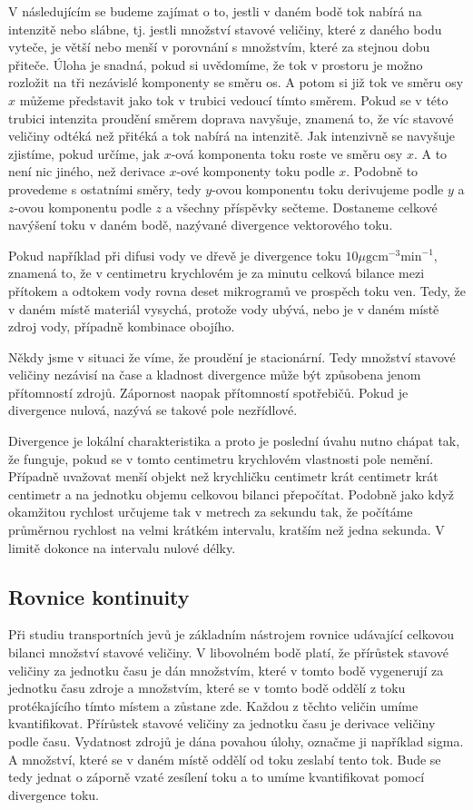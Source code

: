 \documentclass[12pt]{article}
\begin{document}
V následujícím se budeme zajímat o to, jestli v daném bodě tok nabírá na intenzitě nebo slábne, tj. jestli množství stavové veličiny, které z daného bodu vyteče, je větší nebo menší v porovnání s množstvím, které za stejnou dobu přiteče. Úloha je snadná, pokud si uvědomíme, že tok v prostoru je možno rozložit na tři nezávislé komponenty se směru os. A potom si již tok ve směru osy $x$ můžeme představit jako tok v trubici vedoucí tímto směrem. Pokud se v této trubici intenzita proudění směrem doprava navyšuje, znamená to, že víc stavové veličiny odtéká než přitéká a tok nabírá na intenzitě. Jak intenzivně se navyšuje zjistíme, pokud určíme, jak $x$-ová komponenta toku roste ve směru osy $x$. A to není nic jiného, než derivace $x$-ové komponenty toku podle $x$. Podobně to provedeme s ostatními směry, tedy $y$-ovou komponentu toku derivujeme podle $y$ a $z$-ovou komponentu podle $z$ a všechny příspěvky sečteme. Dostaneme celkové navýšení toku v daném bodě, nazývané divergence vektorového toku. 

Pokud například při difusi vody ve dřevě je divergence toku $10\mu \mathrm g \mathrm {cm}^{-3} \mathrm {min}^{-1}$, znamená to, že v centimetru krychlovém je za minutu celková bilance mezi přítokem a odtokem vody rovna deset mikrogramů ve prospěch toku ven. Tedy, že v daném místě materiál vysychá, protože vody ubývá, nebo je v daném místě zdroj vody, případně kombinace obojího. 

Někdy jsme v situaci že víme, že proudění je stacionární. Tedy množství stavové veličiny nezávisí na čase a kladnost divergence může být způsobena jenom přítomností zdrojů. Zápornost naopak přítomností spotřebičů. Pokud je divergence nulová, nazývá se takové pole nezřídlové.

Divergence je lokální charakteristika a proto je poslední úvahu nutno chápat tak, že funguje, pokud se v tomto centimetru krychlovém vlastnosti pole nemění. Případně uvažovat menší objekt než krychličku centimetr krát centimetr krát centimetr a na jednotku objemu celkovou bilanci přepočítat. Podobně jako když okamžitou rychlost určujeme tak v metrech za sekundu tak, že počítáme průměrnou rychlost na velmi krátkém intervalu, kratším než jedna sekunda. V limitě dokonce na intervalu nulové délky.


\subsection{Rovnice kontinuity}

Při studiu transportních jevů je základním nástrojem rovnice udávající celkovou bilanci množství stavové veličiny. V libovolném bodě platí, že přírůstek stavové veličiny za jednotku času je dán množstvím, které v tomto bodě vygenerují za jednotku času zdroje a množstvím, které se v tomto bodě oddělí z toku protékajícího tímto místem a zůstane zde. Každou z těchto veličin umíme kvantifikovat. Přírůstek stavové veličiny za jednotku času je derivace veličiny podle času. Vydatnost zdrojů je dána povahou úlohy, označme ji například sigma. A množství, které se v daném místě oddělí od toku zeslabí tento tok. Bude se tedy jednat o záporně vzaté zesílení toku a to umíme kvantifikovat pomocí divergence toku.
\end{document}
